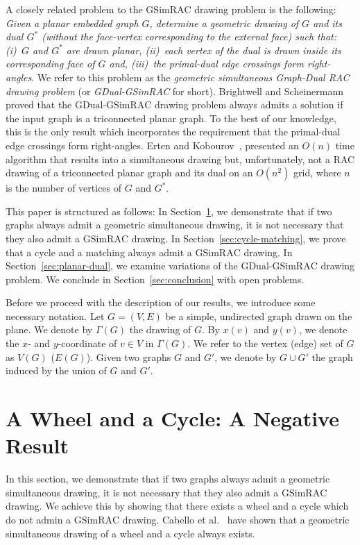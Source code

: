 \documentclass{llncs}
\newcommand{\GSimRAC}{\mathrm{GSimRAC}}
\newcommand{\GDual}{\mathrm{GDual\text{-}GSimRAC}}
\begin{document}
A closely related problem to the $\GSimRAC$ drawing problem is the
following: \emph{Given a planar embedded graph $G$, determine a
geometric drawing of $G$ and its dual $G^*$ (without the face-vertex
corresponding to the external face) such that: (i)~$G$ and $G^*$ are
drawn planar, (ii)~each vertex of the dual is drawn inside its
corresponding face of $G$ and, (iii)~the primal-dual edge crossings
form right-angles}. We refer to this problem as the \emph{geometric
simultaneous Graph-Dual RAC drawing problem} (or
\emph{GDual-GSimRAC} for short). Brightwell and
Scheinermann~\cite{BS93} proved that the $\GDual$ drawing problem
always admits a solution if the input graph is a triconnected planar
graph. To the best of our knowledge, this is the only result which
incorporates the requirement that the primal-dual edge crossings
form right-angles. Erten and Kobourov~\cite{EK05}, presented an
$O(n)$ time algorithm that results into a simultaneous drawing but,
unfortunately, not a RAC drawing of a triconnected planar graph and
its dual on an $O(n^2)$
grid, where $n$ is the number of vertices of $G$ and $G^*$.


This paper is structured as follows: In
Section~\ref{sec:wheel-cycle}, we demonstrate that if two graphs
always admit a geometric simultaneous drawing, it is not necessary
that they also admit a $\GSimRAC$ drawing. In
Section~\ref{sec:cycle-matching}, we prove that a cycle and a
matching always admit a $\GSimRAC$ drawing. In
Section~\ref{sec:planar-dual}, we examine variations of the $\GDual$
drawing problem. We conclude in Section~\ref{sec:conclusion} with
open problems.

Before we proceed with the description of our results, we introduce
some necessary notation. Let $G=(V,E)$ be a simple, undirected graph
drawn on the plane. We denote by $\Gamma(G)$ the drawing of $G$. By
$x(v)$ and $y(v)$, we denote the $x$- and $y$-coordinate of $v \in
V$ in $\Gamma(G)$. We refer to the vertex (edge) set of $G$ as
$V(G)$ ($E(G)$). Given two graphs $G$ and $G'$, we denote by $G \cup
G'$ the graph induced by the union of $G$ and $G'$.

\section{A Wheel and a Cycle: A Negative Result}
\label{sec:wheel-cycle}


In this section, we demonstrate that if two graphs always admit a
geometric simultaneous drawing, it is not necessary that they also
admit a $\GSimRAC$ drawing. We achieve this by showing that there
exists a wheel and a cycle which do not admin a $\GSimRAC$ drawing.
Cabello et al.\ \cite{CvKLMSV11} have shown that a geometric
simultaneous drawing of a wheel and a cycle always exists.
\end{document}
